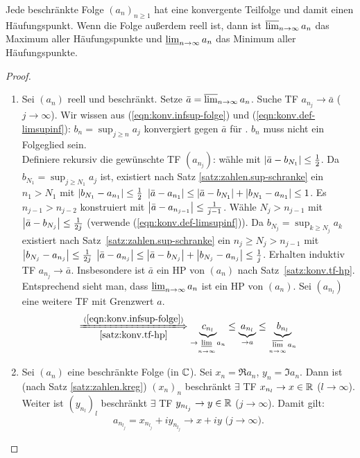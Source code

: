 \documentclass[12pt]{scrreprt}
\begin{document}
\begin{thm}
  \label{thm:konv.bw}
  Jede beschränkte Folge $(a_n)_{n\ge1}$ hat eine konvergente
  Teilfolge und damit einen Häufungspunkt. Wenn die Folge außerdem
  reell ist, dann ist $\varlimsup_{n\rightarrow\infty}{a_n}$ das Maximum aller
  Häufungspunkte und $\varliminf_{n\rightarrow\infty}{a_n}$ das Minimum aller
  Häufungspunkte.
\end{thm}
\begin{proof}
  \begin{enumerate}
  \item Sei $(a_n)$ reell und beschränkt. Setze $\bar{a} = \varlimsup_{n\rightarrow\infty}{a_n}$. Suche TF $a_{n_j}\to\bar{a}$ ($j\to\infty$). Wir wissen aus (\ref{eqn:konv.infsup-folge}) und (\ref{eqn:konv.def-limsupinf}): $b_n=\sup_{j\ge n}{a_j}$ konvergiert gegen $\bar{a}$ für \ninf. $b_n$ muss nicht ein Folgeglied sein.\\
    Definiere rekursiv die gewünschte TF $(a_{n_j})$: wähle 
    mit $\left\lvert\bar{a}-b_{N_1}\right\lvert\le\frac12$. Da $b_{N_1} = \sup_{j\ge
      N_1}{a_j}$ ist, existiert nach Satz
    \ref{satz:zahlen.sup-schranke} ein $n_1>N_1$ mit
    $\left\lvert b_{N_1}-a_{n_1}\right\lvert\le\frac12$ \folgt $\left\lvert\bar{a}-a_{n_1}\right\lvert
    \le \left\lvert\bar{a}-b_{N_1}\right\lvert + \left\lvert b_{N_1}-a_{n_1}\right\lvert \le 1$. Es
    $n_{j-1}>n_{j-2}$ konstruiert mit
    $\left\lvert\bar{a}-a_{n_{j-1}}\right\lvert\le\frac{1}{j-1}$. Wähle $N_j>n_{j-1}$
    mit $\left\lvert\bar{a}-b_{N_j}\right\lvert\le\frac{1}{2j}$ (verwende
    (\ref{eqn:konv.def-limsupinf})). Da $b_{N_j} = \sup_{k\ge
      N_j}{a_k}$ existiert nach Satz~\ref{satz:zahlen.sup-schranke}
    ein $n_j\ge N_j>n_{j-1}$ mit
    $\left\lvert b_{N_j}-a_{n_j}\right\lvert\le\frac{1}{2j}$ \folgt
    $\left\lvert\bar{a}-a_{n_j}\right\lvert \le \left\lvert\bar{a}-b_{N_j}\right\lvert +
    \left\lvert b_{N_j}-a_{n_j}\right\lvert \le \frac1j$. Erhalten induktiv TF
    $a_{n_j}\to\bar{a}$. Insbesondere ist $\bar{a}$ ein HP von $(a_n)$
    nach Satz~\ref{satz:konv.tf-hp}. Entsprechend sieht man, dass
    $\varliminf_{n\rightarrow\infty}{a_n}$ ist ein HP von $(a_n)$. Sei $(a_{n_l})$ eine
    weitere TF mit Grenzwert $a$.
    \[\xLongrightarrow[\ref{satz:konv.tf-hp}]{(\ref{eqn:konv.infsup-folge})}
    \underbrace{c_{n_l}}_{\to\li\limits_{\ninf}{a_n}} \le
    \underbrace{a_{n_l}}_{\to a} \le
    \underbrace{b_{n_l}}_{\ls\limits_{\ninf}{a_n}}\]
  \item Sei $(a_n)$ eine beschränkte Folge (in $\mathbb{C}$). Sei
    $x_n=\Re{a_n}$, $y_n=\Im{a_n}$. Dann ist (nach Satz
    \ref{satz:zahlen.kreg}) $(x_n)_n$ beschränkt 
    $\exists$ TF $x_{n_l}\to x\in\mathbb{R}$ ($l\to\infty$). Weiter ist
    $(y_{n_l})_l$ beschränkt  $\exists$ TF
    $y_{n_{l_j}}\to y\in\mathbb{R}$ ($j\to\infty$). Damit gilt:
    \[a_{n_{l_j}} = x_{n_{l_j}} + iy_{n_{l_j}} \to x+iy \text{ (}
    j\to\infty \text{)}.\]
  \end{enumerate}
\end{proof}
\end{document}

